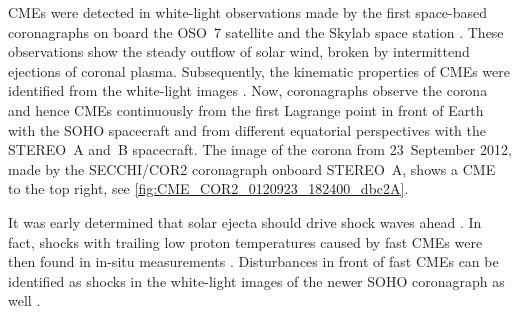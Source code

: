 CMEs were detected in white-light observations made by the first space-based coronagraphs on board the OSO~7 satellite \citep{Tousey1973} and the Skylab space station \citep{MacQueen1974}. These observations show the steady outflow of solar wind, broken by intermittend ejections of coronal plasma. Subsequently, the kinematic properties of CMEs were identified from the white-light images \citep{MacQueen1980}. Now, coronagraphs observe the corona and hence CMEs continuously from the first Lagrange point in front of Earth with the SOHO spacecraft and from different equatorial perspectives with the STEREO~A and~B spacecraft. The image of the corona from 23~September 2012, made by the SECCHI/COR2 coronagraph onboard STEREO~A, shows a CME to the top right, see \autoref{fig:CME_COR2_0120923_182400_dbc2A}.\\
\begin{figure}[htb]
\end{figure}

It was early determined that solar ejecta should drive shock waves ahead \citep{Gold1962}. In fact, shocks with trailing low proton temperatures caused by fast CMEs were then found in in-situ measurements \citep{Gosling1973,Gosling1974}. Disturbances in front of fast CMEs can be identified as shocks in the white-light images of the newer SOHO coronagraph as well \citep{Sheeley2000}.\\




